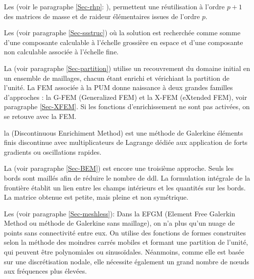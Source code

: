 \medskip 
Les  
(voir le paragraphe \ref{Sec-rhp}:
), permettent une réutilisation à l'ordre $p+1$ des matrices 
de masse et de raideur élémentaires issues de l'ordre $p$.

Les  (voir paragraphe \ref{Sec-ssstruc}) où la solution est 
recherchée comme somme d'une composante calculable à l'échelle grossière en espace et 
d'une composante non calculable associée à l'échelle fine.

La  (voir paragraphe \ref{Sec-partition}) utilise un recouvrement 
du domaine initial en un ensemble  de maillages, chacun étant enrichi et vérichiant la partition de l'unité.
La FEM associée à la PUM donne naissance à deux grandes familles d'approches :
la G-FEM (Generalized FEM) et la X-FEM (eXtended FEM), 
voir paragraphe \ref{Sec-XFEM}.
Si les fonctions d'enrichissement ne sont pas activées, on se retouve avec la FEM.

la  
(Discontinuous Enrichiment Method) est une méthode de Galerkine éléments finis
discontinue avec multiplicateurs de Lagrange 
dédiée aux application de forts gradients ou oscillations rapides.

\bigskip
La  
(voir paragraphe \ref{Sec-BEM}) est encore une \og troisième\fg{} approche.
Seuls les bords sont maillés afin de réduire le nombre de ddl.
La formulation intégrale de la frontière établit un lien entre les champs intérieurs
et les quantités sur les bords.
La matrice obtenue est petite, mais pleine et non symétrique.

\bigskip
Les  (voir paragraphe \ref{Sec-meshless}):
Dans la EFGM (Element Free Galerkin Method ou méthode de Galerkine sans maillage), 
on n'a plus qu'un nuage de points sans connectivité entre eux.
On utilise des fonctions de formes construites selon la méthode des moindres carrés mobiles et
formant une partition de l'unité, qui peuvent être polynomiales 
ou sinusoïdales.
Néanmoins, comme elle est basée sur une discrétisation nodale, elle nécessite également
un grand nombre de nœuds aux fréquences plus élevées.

